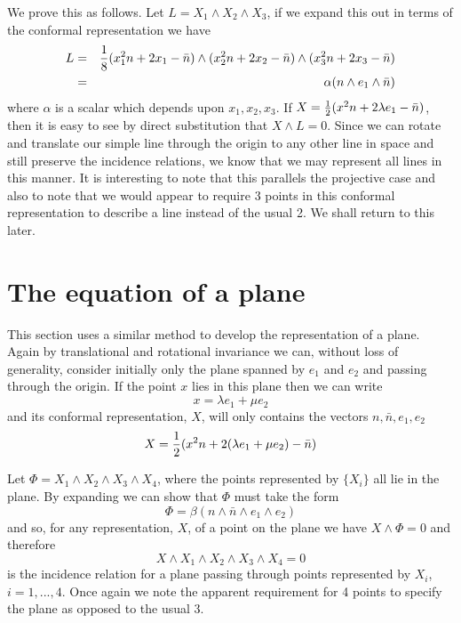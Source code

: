 We prove this as follows. Let $L=X_1\wedge X_2\wedge X_3$,
if we expand this out in terms of the conformal
representation we have
%
\begin{eqnarray}
 L & = & \frac{1}{8}(x_1^2n + 2x_1-\bar{n})\wedge (x_2^2n + 2x_2-\bar{n})\wedge (x_3^2n
+ 2x_3-\bar{n})\nonumber \\
   & = & \alpha (n\wedge e_1 \wedge \bar{n})
\end{eqnarray}
%
where $\alpha$ is a scalar which depends upon $x_1,x_2,x_3$.
If $X = \frac{1}{2}(x^2n + 2\lambda e_1 - \bar{n})$, then it is easy to see by
direct substitution that $X\wedge L = 0$. Since we can rotate and
translate our simple line through the origin to any other
line in space and still preserve the incidence relations,
we know that we may represent all lines in this manner. It is
interesting to note that this parallels the projective case
and also to note that we would appear to require 3 points in this
conformal representation to describe a line instead of the usual
2. We shall return to this later.

\section{The equation of a plane}

This section uses a similar method to develop the representation
of a plane. Again by translational and rotational invariance we can, 
without loss of generality, consider initially only the plane spanned
by $e_1$ and $e_2$ and passing through the origin. If the point $x$ 
lies in this plane then we can write
%
\[  x = \lambda e_1 + \mu e_2  \]
%
and its conformal representation, $X$, will only
contains the vectors  $n,\bar{n},e_1,e_2$
%
\[ X =  \frac{1}{2}(x^2n + 2(\lambda e_1 + \mu e_2) - \bar{n})  \]

Let $\Phi = X_1 \wedge X_2 \wedge X_3 \wedge X_4$, where the points represented
by $\{X_i\}$ all lie in the plane. By expanding we can show that 
$\Phi$ must take the form
%
\[  \Phi = \beta (n\wedge \bar{n} \wedge e_1 \wedge e_2)  \]
%
and so, for any representation, $X$, of a point on the plane we have 
$X\wedge \Phi = 0$ and therefore
%
\begin{equation}
     X\wedge X_1 \wedge X_2 \wedge X_3 \wedge X_4 = 0
     \end{equation}
%
is the incidence relation for a plane passing through points represented by
$X_i$, $i=1,...,4$. Once again we note the apparent requirement for
4 points to specify the plane as opposed to the usual 3.


